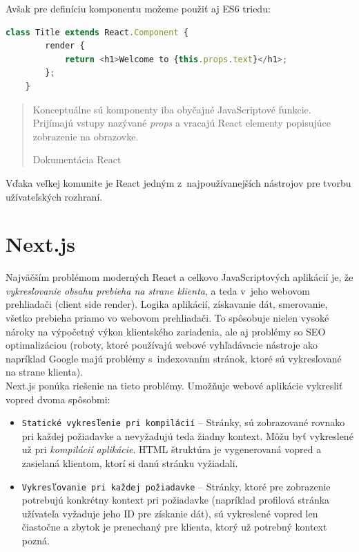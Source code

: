 \medskip

\noindent Avšak pre definíciu komponentu možeme použiť aj ES6 triedu: \\

\begin{lstlisting}[language=TypeScript, caption=Príklad definície triedneho komponentu.]
	class Title extends React.Component {
		render {
			return <h1>Welcome to {this.props.text}</h1>;
		};
	}
\end{lstlisting}

\medskip

\blockquote[Dokumentácia React \cite{React}]{Konceptuálne sú komponenty iba obyčajné JavaScriptové funkcie. Prijímajú vstupy nazývané \emph{props} a vracajú React elementy popisujúce zobrazenie na obrazovke.}

\noindent Vďaka veľkej komunite je React jedným z~najpoužívanejších nástrojov pre tvorbu užívateľských rozhraní. 

\section{Next.js}
\label{theory:nextjs}
Najväčším problémom moderných React a celkovo JavaScriptových aplikácií je, že \emph{vykresľovanie obsahu prebieha na strane klienta}, a teda v~jeho webovom prehliadači (client side render). Logika aplikácií, získavanie dát, smerovanie, všetko prebieha priamo vo webovom prehliadači. To spôsobuje nielen vysoké nároky na výpočetný výkon klientského zariadenia, ale aj problémy so SEO optimalizáciou (roboty, ktoré používajú webové vyhľadávacie nástroje ako napríklad Google majú problémy s~indexovaním stránok, ktoré sú vykresľované na strane klienta). \\

\noindent Next.js ponúka riešenie na tieto problémy. Umožňuje webové aplikácie vykresliť vopred dvoma spôsobmi:

\begin{itemize}
	\item \texttt{Statické vykresľenie pri kompilácií} -- Stránky, sú zobrazované rovnako pri každej požiadavke a nevyžadujú teda žiadny kontext. Môžu byť vykreslené už pri \emph{kompilácií aplikácie}. HTML štruktúra je vygenerovaná vopred a zasielaná klientom, ktorí si danú stránku vyžiadali.
	\item \texttt{Vykresľovanie pri každej požiadavke} -- Stránky, ktoré pre zobrazenie potrebujú konkrétny kontext pri požiadavke (napríklad profilová stránka užívateľa vyžaduje jeho ID pre získanie dát), sú vykreslené vopred len čiastočne a zbytok je prenechaný pre klienta, ktorý už potrebný kontext pozná.
\end{itemize}


